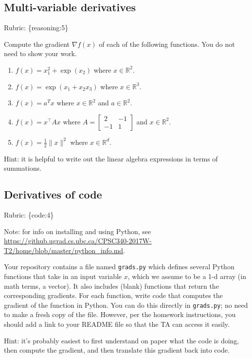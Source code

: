 \documentclass{article}
\def\rubric#1{\gre{Rubric: \{#1\}}}{}
\def\blu#1{{\color{blu}#1}}
\def\gre#1{{\color{gre}#1}}
\def\red#1{{\color{red}#1}}
\def\norm#1{\|#1\|}
\def\R{\mathbb{R}}
\begin{document}
\subsection{Multi-variable derivatives}
\rubric{reasoning:5}

\blu{Compute the gradient $\nabla f(x)$ of each of the following functions.} \red{You do not need to show your work.}
\begin{enumerate}
\item $f(x) = x_1^2 + \exp(x_2)$ where $x \in \R^2$.
\item $f(x) = \exp(x_1 + x_2x_3)$ where $x \in \mathbb{R}^3$.
\item $f(x) = a^Tx$ where $x \in \R^2$ and $a \in \R^2$.
\item $f(x) = x^\top A x$ where $A=\left[ \begin{array}{cc}
2 & -1 \\
 -1 & 1 \end{array} \right]$ and $x \in \mathbb{R}^2$.
 \item $f(x) = \frac{1}{2}\norm{x}^2$ where $x \in \R^d$.
\end{enumerate}

Hint: it is helpful to write out the linear algebra expressions in terms of summations.





\subsection{Derivatives of code}

\rubric{code:4}

Note: for info on installing and using Python, see \url{https://github.ugrad.cs.ubc.ca/CPSC340-2017W-T2/home/blob/master/python_info.md}.

Your repository contains a file named \texttt{grads.py} which defines several Python functions that take in an input variable $x$, which we assume to be a 1-d array (in math terms, a vector).
It also includes (blank) functions that return the corresponding gradients.
For each function, \blu{write code that computes the gradient of the function} in Python. 
You can do this directly in \texttt{grads.py}; no need to make a fresh copy of the file. However, per the homework instructions, you should add a link to your README file so that the TA can access it easily. 

Hint: it's probably easiest to first understand on paper what the code is doing, then compute
the gradient, and then translate this gradient back into code.
\end{document}
